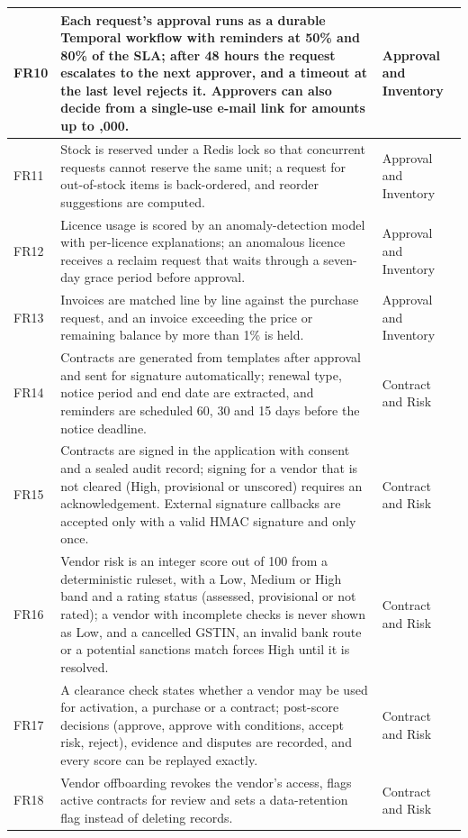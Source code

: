 {\begin{longtable}{|L{0.07\textwidth}|L{0.64\textwidth}|L{0.17\textwidth}|}
FR10 & Each request's approval runs as a durable Temporal workflow with reminders at 50\% and 80\% of the SLA; after 48 hours the request escalates to the next approver, and a timeout at the last level rejects it. Approvers can also decide from a single-use e-mail link for amounts up to ,000. & Approval and Inventory \\ \hline
FR11 & Stock is reserved under a Redis lock so that concurrent requests cannot reserve the same unit; a request for out-of-stock items is back-ordered, and reorder suggestions are computed. & Approval and Inventory \\ \hline
FR12 & Licence usage is scored by an anomaly-detection model with per-licence explanations; an anomalous licence receives a reclaim request that waits through a seven-day grace period before approval. & Approval and Inventory \\ \hline
FR13 & Invoices are matched line by line against the purchase request, and an invoice exceeding the price or remaining balance by more than 1\% is held. & Approval and Inventory \\ \hline
FR14 & Contracts are generated from templates after approval and sent for signature automatically; renewal type, notice period and end date are extracted, and reminders are scheduled 60, 30 and 15 days before the notice deadline. & Contract and Risk \\ \hline
FR15 & Contracts are signed in the application with consent and a sealed audit record; signing for a vendor that is not cleared (High, provisional or unscored) requires an acknowledgement. External signature callbacks are accepted only with a valid HMAC signature and only once. & Contract and Risk \\ \hline
FR16 & Vendor risk is an integer score out of 100 from a deterministic ruleset, with a Low, Medium or High band and a rating status (assessed, provisional or not rated); a vendor with incomplete checks is never shown as Low, and a cancelled GSTIN, an invalid bank route or a potential sanctions match forces High until it is resolved. & Contract and Risk \\ \hline
FR17 & A clearance check states whether a vendor may be used for activation, a purchase or a contract; post-score decisions (approve, approve with conditions, accept risk, reject), evidence and disputes are recorded, and every score can be replayed exactly. & Contract and Risk \\ \hline
FR18 & Vendor offboarding revokes the vendor's access, flags active contracts for review and sets a data-retention flag instead of deleting records. & Contract and Risk \\ \hline

\end{longtable}}
